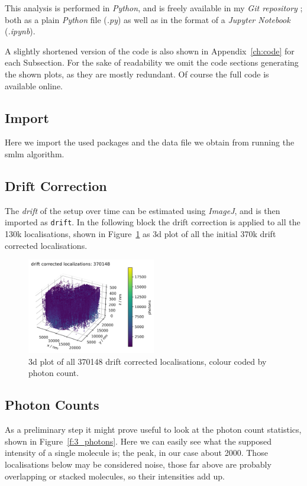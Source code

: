 \documentclass[11pt, a4paper, oneside, twocolumn]{report}
\renewcommand{\tt}{\texttt}
\newcommand{\e}{\emph}
\newcommand{\x}[1]{#1\index{#1}}
\begin{document}
This analysis is performed in \e{\x{Python}}, and is freely available
in my \e{Git repository} \cite{sie21}; both as a plain \e{Python} file
(\e{.py}) as well as in the format of a \e{\x{Jupyter Notebook}}
(\e{.ipynb}).

A slightly shortened version of the code is also shown in
Appendix~\ref{ch:code} for each Subsection. For the sake of
readability we omit the code sections generating the shown plots, as
they are mostly redundant. Of course the full code is available
online.


\subsection{Import}

Here we import the used packages and the data file we obtain from
running the \gls{smlm} algorithm.


\subsection{Drift Correction}

The \e{\x{drift}} of the setup over time can be estimated using
\e{ImageJ}, and is then imported as \tt{drift}. In the following block
the drift correction is applied to all the 130k localisations, shown
in Figure~\ref{f:2_drift} as 3d plot of all the initial 370k drift
corrected localisations.

\begin{figure}[h]
  \centering
  \includegraphics[width=0.5\textwidth]{2_drift.png}
  \caption{3d plot of all 370148 drift corrected localisations, colour
    coded by photon count.}
  \label{f:2_drift}
\end{figure}


\subsection{Photon Counts}

As a preliminary step it might prove useful to look at the photon
count statistics, shown in Figure~\ref{f:3_photons}. Here we can
easily see what the supposed intensity of a single molecule is; the
peak, in our case about 2000. Those localisations below may be
considered noise, those far above are probably overlapping or stacked
molecules, so their intensities add up.
\end{document}
